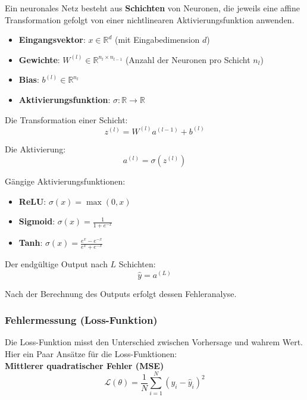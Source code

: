 Ein neuronales Netz besteht aus \textbf{Schichten} von Neuronen, die jeweils eine affine Transformation gefolgt von einer nichtlinearen Aktivierungsfunktion anwenden.

\begin{itemize}
	\item \textbf{Eingangsvektor}: $ x \in \mathbb{R}^d $ (mit Eingabedimension $ d $)
	\item \textbf{Gewichte}: $ W^{(l)} \in \mathbb{R}^{n_{l} \times n_{l-1}} $ (Anzahl der Neuronen pro Schicht $ n_l $)
	\item \textbf{Bias}: $ b^{(l)} \in \mathbb{R}^{n_l} $
	\item \textbf{Aktivierungsfunktion}: $ \sigma: \mathbb{R} \to \mathbb{R} $
\end{itemize}

Die Transformation einer Schicht:
\begin{equation}
	z^{(l)} = W^{(l)} a^{(l-1)} + b^{(l)}
\end{equation}

Die Aktivierung:
\begin{equation}
	a^{(l)} = \sigma(z^{(l)})
\end{equation}

Gängige Aktivierungsfunktionen:
\begin{itemize}
	\item \textbf{ReLU}: $ \sigma(x) = \max(0, x) $
	\item \textbf{Sigmoid}: $ \sigma(x) = \frac{1}{1 + e^{-x}} $
	\item \textbf{Tanh}: $ \sigma(x) = \frac{e^x - e^{-x}}{e^x + e^{-x}} $
\end{itemize}

Der endgültige Output nach $ L $ Schichten:
\begin{equation}
	\hat{y} = a^{(L)}
\end{equation}

Nach der Berechnung des Outputs erfolgt dessen Fehleranalyse.

\subsubsection{Fehlermessung (Loss-Funktion)}

Die Loss-Funktion misst den Unterschied zwischen Vorhersage und wahrem Wert. Hier ein Paar Ansätze für die Loss-Funktionen: \\

\textbf{Mittlerer quadratischer Fehler (MSE)}
\begin{equation}
	\mathcal{L}(\theta) = \frac{1}{N} \sum_{i=1}^{N} (y_i - \hat{y}_i)^2
\end{equation}

